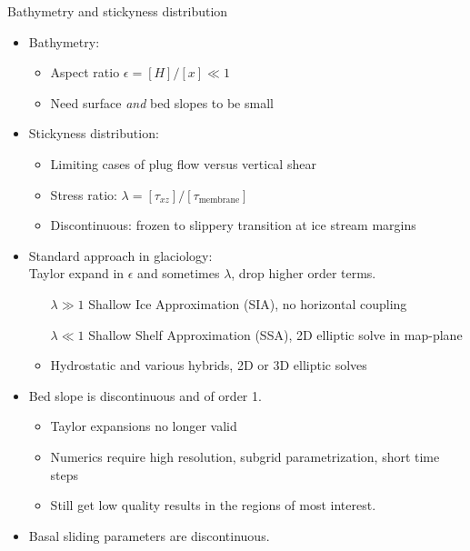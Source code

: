 \begin{frame}[shrink=5]{Bathymetry and stickyness distribution}
  \begin{itemize}
  \item Bathymetry:
    \begin{itemize}
    \item Aspect ratio $\epsilon = [H]/[x] \ll 1$
    \item Need surface \emph{and} bed slopes to be small
    \end{itemize}
  \item Stickyness distribution:
    \begin{itemize}
    \item Limiting cases of plug flow versus vertical shear
    \item Stress ratio: $\lambda = [\tau_{xz}]/[\tau_{\text{membrane}}]$
    \item Discontinuous: frozen to slippery transition at ice stream margins
    \end{itemize}
  \item Standard approach in glaciology: \\
    Taylor expand in $\epsilon$ and sometimes $\lambda$, drop higher order terms.
    \begin{itemize}
    \item[$\lambda \gg 1$] Shallow Ice Approximation (SIA), no horizontal coupling
    \item[$\lambda \ll 1$] Shallow Shelf Approximation (SSA), 2D elliptic solve in map-plane
    \item Hydrostatic and various hybrids, 2D or 3D elliptic solves
    \end{itemize}
  \item \alert{\large Bed slope is discontinuous and of order 1.}
    \begin{itemize}
    \item Taylor expansions no longer valid
    \item Numerics require high resolution, subgrid parametrization, short time steps
    \item Still get low quality results in the regions of most interest.
    \end{itemize}
  \item \alert{\large Basal sliding parameters are discontinuous.}
  \end{itemize}
\end{frame}
